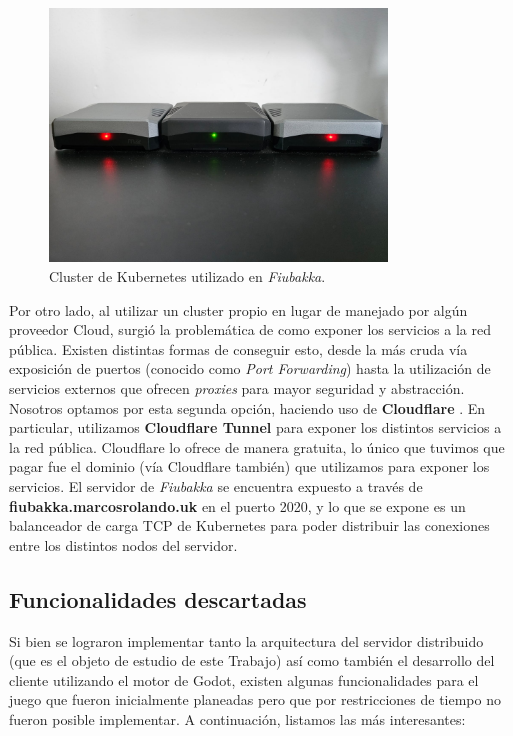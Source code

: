 \begin{figure}[htbp]
    \centering
    \includegraphics[width=0.8\textwidth]{../assets/fiubakka-cluster-pis.png}
    \caption{Cluster de Kubernetes utilizado en \textit{Fiubakka}.}
\end{figure}

Por otro lado, al utilizar un cluster propio en lugar de manejado por algún proveedor Cloud, surgió la problemática de como exponer los servicios a la red pública. Existen distintas formas de conseguir esto, desde la más cruda vía
exposición de puertos (conocido como \textit{Port Forwarding}) hasta la utilización de servicios externos que ofrecen \textit{proxies} para mayor seguridad y abstracción. Nosotros optamos por esta segunda opción, haciendo uso de
\textbf{Cloudflare} \label{ref:cloudflare}. En particular, utilizamos \textbf{Cloudflare Tunnel} para exponer los distintos servicios a la red pública. Cloudflare lo ofrece de manera gratuita, lo único que tuvimos que pagar fue el dominio (vía Cloudflare
también) que utilizamos para exponer los servicios. El servidor de \textit{Fiubakka} se encuentra expuesto a través de \textbf{fiubakka.marcosrolando.uk} en el puerto 2020, y lo que se expone es un balanceador de carga TCP de Kubernetes
para poder distribuir las conexiones entre los distintos nodos del servidor.

\subsection{Funcionalidades descartadas}
\label{sec:lessons-discarded}

Si bien se lograron implementar tanto la arquitectura del servidor distribuido (que es el objeto
de estudio de este Trabajo) así como también el desarrollo del cliente utilizando el motor de Godot, existen algunas funcionalidades para el juego que fueron inicialmente
planeadas pero que por restricciones de tiempo no fueron posible implementar. A continuación, listamos 
las más interesantes:

